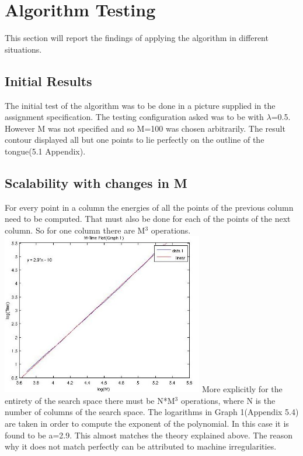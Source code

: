 \documentclass[12pt,a4paper,twocolumn]{article}
\begin{document}
\section{Algorithm Testing}
This section will report the findings of applying the algorithm in different situations.
\subsection{Initial Results}
The initial test of the algorithm was to be done in a picture supplied in the assignment specification. The testing configuration asked was to be with $\lambda$=0.5. However M was not specified and so M=100 was chosen arbitrarily. The result contour displayed all but one points to lie perfectly on the outline of the tongue(5.1 Appendix).
\subsection{Scalability with changes in M}
For every point in a column the energies of all the points of the previous column need to be computed. That must also be done for each of the points of the next column. So for one column there are M$^3$ operations. 
\includegraphics[width=250pt,height=200pt,scale=1]{logs.jpg}	
More explicitly for the entirety of the search space there must be N*M$^3$ operations, where N is the number of columns of the search space. The logarithms in Graph 1(Appendix 5.4) are taken in order to compute the exponent of the polynomial. In this case it is found to be a=2.9. This almost matches the theory explained above. The reason why it does not match perfectly can be attributed to machine irregularities.
\end{document}
